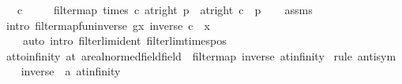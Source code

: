 \begin{isabellebody}
\ \ \ {\isachardoublequoteopen}c\ {\isachargreater}{\kern0pt}\ {}{\isachardoublequoteclose}\isanewline
\ \ \ {\isachardoublequoteopen}filtermap\ {\isacharparenleft}{\kern0pt}times\ c{\isacharparenright}{\kern0pt}\ {\isacharparenleft}{\kern0pt}at{\isacharunderscore}{\kern0pt}right\ p{\isacharparenright}{\kern0pt}\ {\isacharequal}{\kern0pt}\ at{\isacharunderscore}{\kern0pt}right\ {\isacharparenleft}{\kern0pt}c\ {\isacharasterisk}{\kern0pt}\ p{\isacharparenright}{\kern0pt}{\isachardoublequoteclose}\isanewline
%
\isadelimproof
\ \ %
\endisadelimproof
%
\isatagproof
{}\isamarkupfalse%
\ assms\isanewline
\ \ \isamarkupfalse%
\ {\isacharparenleft}{\kern0pt}intro\ filtermap{\isacharunderscore}{\kern0pt}fun{\isacharunderscore}{\kern0pt}inverse{\isacharbrackleft}{\kern0pt}\ g{\isacharequal}{\kern0pt}{\isachardoublequoteopen}{\isasymlambda}x{\isachardot}{\kern0pt}\ inverse\ c\ {\isacharasterisk}{\kern0pt}\ x{\isachardoublequoteclose}{\isacharbrackright}{\kern0pt}{\isacharparenright}{\kern0pt}\isanewline
\ \ \ \ {\isacharparenleft}{\kern0pt}auto\ intro{\isacharbang}{\kern0pt}{\isacharcolon}{\kern0pt}\ filterlim{\isacharunderscore}{\kern0pt}ident\ filterlim{\isacharunderscore}{\kern0pt}times{\isacharunderscore}{\kern0pt}pos{\isacharparenright}{\kern0pt}%
\endisatagproof
{\isafoldproof}%
%
\isadelimproof
\isanewline
%
\endisadelimproof
\isanewline
{}\isamarkupfalse%
\ at{\isacharunderscore}{\kern0pt}to{\isacharunderscore}{\kern0pt}infinity{\isacharcolon}{\kern0pt}\ {\isachardoublequoteopen}{\isacharparenleft}{\kern0pt}at\ {\isacharparenleft}{\kern0pt}{}{\isacharcolon}{\kern0pt}{\isacharcolon}{\kern0pt}{\isacharprime}{\kern0pt}a{\isacharcolon}{\kern0pt}{\isacharcolon}{\kern0pt}{\isacharbraceleft}{\kern0pt}real{\isacharunderscore}{\kern0pt}normed{\isacharunderscore}{\kern0pt}field{\isacharcomma}{\kern0pt}field{\isacharbraceright}{\kern0pt}{\isacharparenright}{\kern0pt}{\isacharparenright}{\kern0pt}\ {\isacharequal}{\kern0pt}\ filtermap\ inverse\ at{\isacharunderscore}{\kern0pt}infinity{\isachardoublequoteclose}\isanewline
%
\isadelimproof
%
\endisadelimproof
%
\isatagproof
{}\isamarkupfalse%
\ {\isacharparenleft}{\kern0pt}rule\ antisym{\isacharparenright}{\kern0pt}\isanewline
\ \ \isamarkupfalse%
\ {\isachardoublequoteopen}{\isacharparenleft}{\kern0pt}inverse\ {\isasymlonglongrightarrow}\ {\isacharparenleft}{\kern0pt}{}{\isacharcolon}{\kern0pt}{\isacharcolon}{\kern0pt}{\isacharprime}{\kern0pt}a{\isacharparenright}{\kern0pt}{\isacharparenright}{\kern0pt}\ at{\isacharunderscore}{\kern0pt}infinity{\isachardoublequoteclose}\isanewline

\end{isabellebody}
